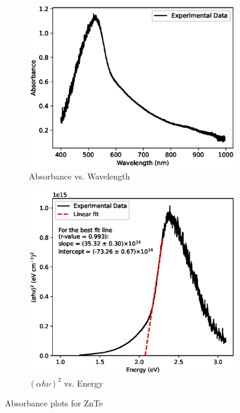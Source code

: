\begin{figure}
    \begin{subfigure}{\linewidth}
    \includegraphics[width=1\textwidth]{images/cdsA.eps}
    \caption{Absorbance vs. Wavelength}
    \end{subfigure}
    
    \begin{subfigure}{\linewidth}
    \includegraphics[width=1\textwidth]{images/cds.eps}
    \caption{$(\alpha h \nu)^2$ vs. Energy}
    \end{subfigure}
    \caption{Absorbance plots for ZnTe}
    \label{cds}
\end{figure}

